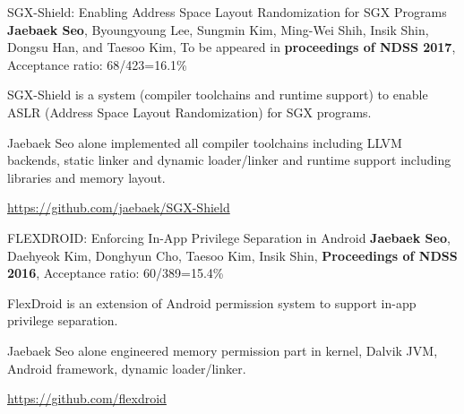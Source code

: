 

\begin{cventries}

  \paperentry
    {SGX-Shield: Enabling Address Space Layout Randomization for SGX Programs} %
    {\textbf{Jaebaek Seo}, Byoungyoung Lee, Sungmin Kim, Ming-Wei Shih, Insik Shin, Dongsu Han, and Taesoo Kim, } %
    { To be appeared in \textbf{proceedings of NDSS 2017}, Acceptance ratio: 68/423=16.1\% } %
    {
        \begin{cvitems} %
        \item {SGX-Shield is a system (compiler toolchains and runtime support)
            to enable ASLR (Address Space Layout Randomization) for SGX programs.}
        \item {Jaebaek Seo alone implemented all compiler toolchains including
                LLVM backends, static linker and dynamic loader/linker and runtime
            support including libraries and memory layout.}
        \item {\url{https://github.com/jaebaek/SGX-Shield}}
        \end{cvitems}
    }

  \paperentry
    { FLEXDROID: Enforcing In-App Privilege Separation in Android } %
    { \textbf{Jaebaek Seo}, Daehyeok Kim, Donghyun Cho, Taesoo Kim, Insik Shin, }
    { \textbf{Proceedings of NDSS 2016}, Acceptance ratio: 60/389=15.4\% } %
    {
        \begin{cvitems} %
        \item {FlexDroid is an extension of Android permission system
            to support in-app privilege separation.}
        \item {Jaebaek Seo alone engineered memory permission part in kernel,
            Dalvik JVM, Android framework, dynamic loader/linker.}
        \item {\url{https://github.com/flexdroid}}
        \end{cvitems}
    }


\end{cventries}
